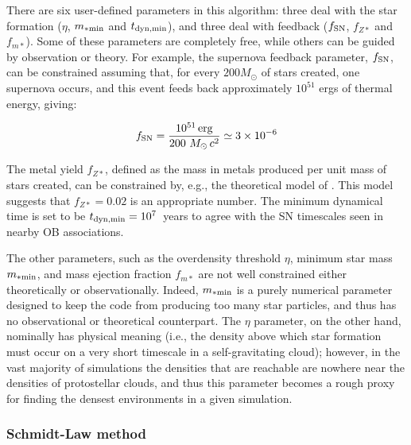 There are six user-defined parameters in this algorithm: three deal
with the star formation ($\eta$, $m_{\rm *min}$ and $t_{\rm
  dyn,min}$), and three deal with feedback ($f_{\rm SN}$, $f_{Z*}$ and
$f_{m*}$).  Some of these parameters are completely free, while others
can be guided by observation or theory.  For example, the supernova
feedback parameter, $f_{\rm SN}$, can be constrained assuming that, for
every $200 M_\odot$ of stars created, one supernova occurs, and this
event feeds back approximately $10^{51}$ ergs of thermal energy,
giving:

\begin{equation}
f_{\rm SN} = \frac{10^{51}\, \mathrm{erg}}{200~M_\odot\, c^2} \simeq 3 \times 10^{-6}
\end{equation}

The metal yield $f_{Z*}$, defined as the mass in metals produced per
unit mass of stars created, can be constrained by, e.g., the
theoretical model of \citet{1995ApJS..101..181W}.  This model suggests
that $f_{Z*} = 0.02$ is an appropriate number.  The minimum dynamical
time is set to be $t_{\rm dyn,min} = 10^7$~years to agree with the SN timescales
seen in nearby OB associations.

The other parameters, such as the overdensity threshold $\eta$,
minimum star mass $m_{\rm *min}$, and mass ejection fraction $f_{m*}$ are
not well constrained either theoretically or observationally.  Indeed,
$m_{\rm *min}$ is a purely numerical parameter designed to keep the code
from producing too many star particles, and thus has no observational
or theoretical counterpart.  The $\eta$ parameter, on the other hand,
nominally has physical meaning (i.e., the density above which star
formation must occur on a very short timescale in a self-gravitating
cloud); however, in the vast majority of simulations the densities
that are reachable are nowhere near the densities of protostellar
clouds, and thus this parameter becomes a rough proxy for finding the
densest environments in a given simulation.  

\subsubsection{Schmidt-Law method}
\label{sec:starform_kravtsov}

